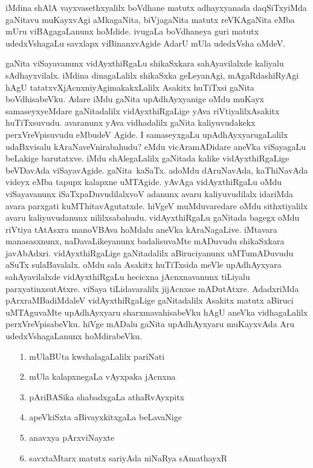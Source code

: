 iMdina shAlA vayxvasethxyalilx boVdhane matutx adhayxyanada daqSiTxyiMda gaNitavu muKayxvAgi aMkagaNita, biVjagaNita matutx reVKAgaNita eMba mUru viBAgagaLanunx hoMdide. ivugaLa boVdhaneya guri matutx udedxVshagaLu savxlapx viBinanxvAgide AdarU mUla udedxVsha oMdeV.

gaNita viSayavanunx vidAyxthiRgaLu shikaSxkara sahAyavilalxde kaliyalu sAdhayxvilalx. iMdina dinagaLalilx shikaSxka geLeyanAgi, mAgaRdashiRyAgi hAgU tatatxvXjAcnxniyAgi\break makakxLalilx Asakitx huTiTxsi gaNita boVdhisabeVku. Adare iMdu gaNita upAdhAyxyanige oMdu muKayx samaseyxyeMdare gaNitadalilx vidAyxthiRgaLige yAva riVtiyalilx\break Asakitx huTiTxsuvudu. avaranunx yAva vidhadalilx gaNita kaliyuvudakekx perxVreVpisuvudu eMbudeV Agide. I samaseyxgaLu upAdhAyxyarugaLalilx udaBxvisalu kAraNaveV\-nirabahudu? eMdu vicAramADidare aneVka viSayagaLu beLakige barutatxve. iMdu shAlegaLalilx gaNitada kalike vidAyxthiRgaLige beVDavAda viSayavAgide. gaNita~kaSaTx. adoMdu dAruNavAda, kaThiNavAda videyx eMba tapupx kalapxne uMTAgide. yAvAga vidAyxthiRgaLu oMdu viSayavanunx iSaTxpaDuvudilalxvoV adanunx avaru kaliyuvudilalx idariMda avara parxgati kuMThitavAgutatxde. hiVgeV muMduvaredare oMdu sithxtiyalilx avaru kaliyuvudanunx nililxsabahudu. vidAyxthiRgaLu gaNitada bagegx oMdu riVtiya tAtAsxra manoVBAva hoMdalu aneVka kAraNagaLive. iMtavara manasasxnunx, naDavaLikeyanunx badalisuvaMte mADuvudu shikaSxkara javAbAdxri. vidAyxthiRgaLige gaNitadalilx aBiruciyanunx uMTumADuvudu aSuTx sulaBavalalx. oMdu sala Asakitx huTiTxsida meVle upAdhAyxyara sahAyavilalxde vidAyxthiRgaLu hecicxna jAcnxnavanunx tiLiyalu parxyatinxsutAtxre. viSaya tiLidavaralilx jijAcnxse mADutAtxre. AdadxriMda pArxraMBadiMdaleV vidAyxthiRgaLige gaNitadalilx Asakitx matutx aBiruci uMTAguvaMte upAdhAyxyaru sharxmavahisabeVku hAgU aneVka vidhagaLalilx perxVreVpisabeVku. hiVge mADalu gaNita upAdhAyxyaru muKayxvAda Aru udedxVsha\-gaLanunx hoMdirabeVku.
\begin{enumerate}
\item[{\rm 1.}] mUlaBUta kwshalagaLalilx pariNati
\item[{\rm 2.}] mUla kalapxnegaLa vAyxpaka jAcnxna
\item[{\rm 3.}] pAriBASika shabadxgaLa athaRvAyxpitx
\item[{\rm 4.}] apeVkiSxta aBivayxkitxgaLa beLavaNige
\item[{\rm 5.}] anavxya pArxviNayxte
\item[{\rm 6.}] savxtaMtarx matutx sariyAda niNaRya sAmathayxR
\end{enumerate}

